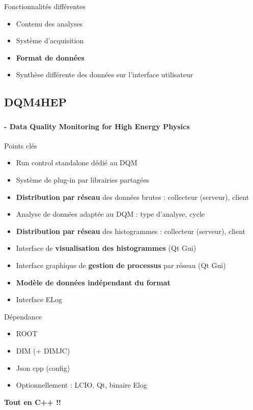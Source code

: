 \documentclass[8pt]{beamer}
\begin{document}
\begin{frame}
\begin{minipage}{0.47\linewidth}
      \begin{block}{Fonctionnalités différentes}
        \begin{itemize}
          \item Contenu des analyses
          \item Système d'acquisition
          \item \textbf{Format de données}
          \item Synthèse différente des données sur l'interface utilisateur
        \end{itemize}
      \end{block}
    \end{minipage}
  \end{frame}  
  
  
  \subsection{DQM4HEP}
  
  \begin{frame}
  \frametitle{\secname}
  \framesubtitle{\subsecname - Data Quality Monitoring for High Energy Physics}
    \begin{block}{Points clés}
      \begin{itemize}
        \pause
        \item Run control standalone dédié au DQM
        \pause
        \item Système de plug-in par librairies partagées
        \pause
        \item \textbf{Distribution par réseau} des données brutes : collecteur (serveur), client
        \pause
        \item Analyse de données adaptée au DQM : type d'analyse, cycle
        \pause
        \item \textbf{Distribution par réseau} des histogrammes : collecteur (serveur), client
        \pause
        \item Interface de \textbf{visualisation des histogrammes} (Qt Gui)
        \pause
        \item Interface graphique de \textbf{gestion de processus} par réseau (Qt Gui)
        \pause
        \item \textbf{Modèle de données indépendant du format}
        \pause
        \item Interface ELog
      \end{itemize}
    \end{block}
    \pause
    \begin{block}{Dépendance}
      \begin{itemize}
        \item ROOT
        \item DIM (+ DIMJC)
        \item Json cpp (config)
        \item Optionnellement : LCIO, Qt, binaire Elog
      \end{itemize}
    \end{block}
    \textbf{Tout en C++ !!} \\
  \end{frame}
  
\end{document}
